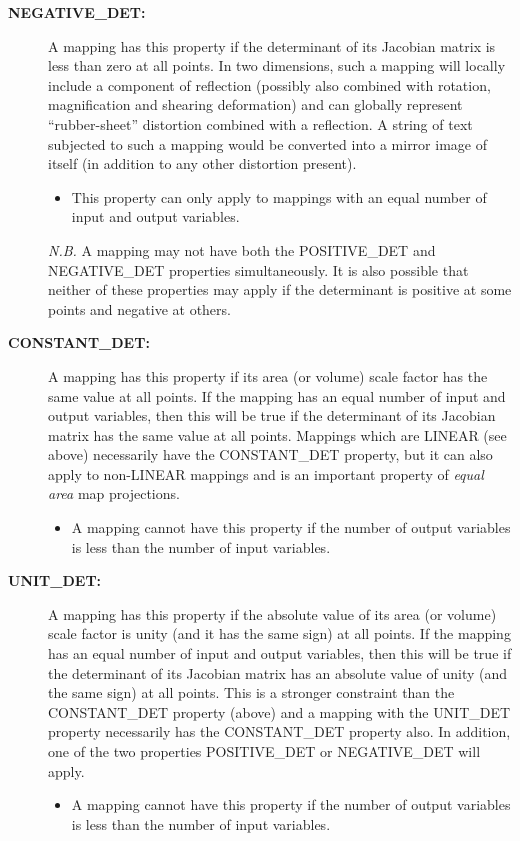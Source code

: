 \documentclass[twoside,nolof,11pt]{starlink}
\providecommand{\name}[1]{\small{#1}}
\begin{document}
\begin{description}
\item[\textbf{NEGATIVE\_DET:}] A mapping has this property if the determinant
of its Jacobian matrix is less than zero at all points.
In two dimensions, such a mapping will locally include a component of
reflection (possibly also combined with rotation, magnification and shearing
deformation) and can globally represent ``rubber-sheet'' distortion
combined with a reflection.
A string of text subjected to such a mapping would be converted into a
mirror image of itself (in addition to any other distortion present).

\begin{itemize}
\item This property can only apply to mappings with an equal number of input
and output variables.
\end{itemize}

\emph{N.B.} A mapping may not have both the \name{POSITIVE\_DET} and
\name{NEGATIVE\_DET} properties simultaneously.
It is also possible that neither of these properties may apply if the
determinant is positive at some points and negative at others.

\item[\textbf{CONSTANT\_DET:}] A mapping has this property if its area (or
volume) scale factor has the same value at all points.
If the mapping has an equal number of input and output variables, then this
will be true if the determinant of its Jacobian matrix has the same value at
all points.
Mappings which are \name{LINEAR} (see above) necessarily have the
\name{CONSTANT\_DET} property, but it can also apply to non-\name{LINEAR}
mappings and is an important property of \emph{equal area} map projections.

\begin{itemize}
\item A mapping cannot have this property if the number of output variables
is less than the number of input variables.
\end{itemize}

\item[\textbf{UNIT\_DET:}]  A mapping has this property if the absolute value of
its area (or volume) scale factor is unity (and it has the same sign) at all
points.
If the mapping has an equal number of input and output variables, then this
will be true if the determinant of its Jacobian matrix has an absolute value
of unity (and the same sign) at all points.
This is a stronger constraint than the \name{CONSTANT\_DET} property (above)
and a mapping with the \name{UNIT\_DET} property necessarily has the
\name{CONSTANT\_DET} property also.
In addition, one of the two properties \name{POSITIVE\_DET} or
\name{NEGATIVE\_DET} will apply.

\begin{itemize}
\item A mapping cannot have this property if the number of output variables
is less than the number of input variables.
\end{itemize}

\end{description}
\end{document}
